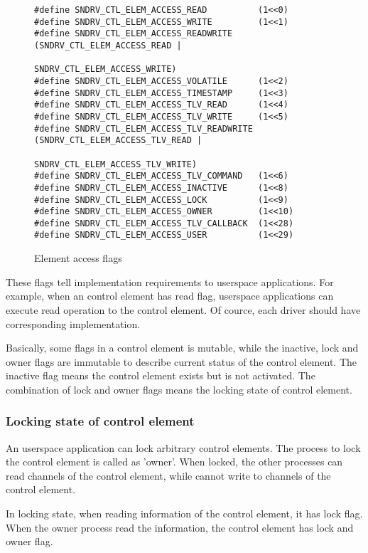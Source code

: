 \documentclass[onecolumn]{article}
\begin{document}
\begin{figure}[htbp]
\small
\begin{verbatim}
#define SNDRV_CTL_ELEM_ACCESS_READ          (1<<0)
#define SNDRV_CTL_ELEM_ACCESS_WRITE         (1<<1)
#define SNDRV_CTL_ELEM_ACCESS_READWRITE     (SNDRV_CTL_ELEM_ACCESS_READ |
                                             SNDRV_CTL_ELEM_ACCESS_WRITE)
#define SNDRV_CTL_ELEM_ACCESS_VOLATILE      (1<<2)
#define SNDRV_CTL_ELEM_ACCESS_TIMESTAMP     (1<<3)
#define SNDRV_CTL_ELEM_ACCESS_TLV_READ      (1<<4)
#define SNDRV_CTL_ELEM_ACCESS_TLV_WRITE     (1<<5)
#define SNDRV_CTL_ELEM_ACCESS_TLV_READWRITE (SNDRV_CTL_ELEM_ACCESS_TLV_READ |
                                             SNDRV_CTL_ELEM_ACCESS_TLV_WRITE)
#define SNDRV_CTL_ELEM_ACCESS_TLV_COMMAND   (1<<6)
#define SNDRV_CTL_ELEM_ACCESS_INACTIVE      (1<<8)
#define SNDRV_CTL_ELEM_ACCESS_LOCK          (1<<9)
#define SNDRV_CTL_ELEM_ACCESS_OWNER         (1<<10)
#define SNDRV_CTL_ELEM_ACCESS_TLV_CALLBACK  (1<<28)
#define SNDRV_CTL_ELEM_ACCESS_USER          (1<<29)
\end{verbatim}
\caption{{Element access flags}}
\label{fig:element-access-flags}
\end{figure}

These flags tell implementation requirements to userspace applications. For example, when an control element has read flag, userspace applications can execute read operation to the control element. Of cource, each driver should have corresponding implementation.

Basically, some flags in a control element is mutable, while the inactive, lock and owner flags are immutable to describe current status of the control element. The inactive flag means the control element exists but is not activated. The combination of lock and owner flags means the locking state of control element.


\subsubsection{Locking state of control element}

An userspace application can lock arbitrary control elements. The process to lock the control element is called as 'owner'. When locked, the other processes can read channels of the control element, while cannot write to channels of the control element.

In locking state, when reading information of the control element, it has lock flag. When the owner process read the information, the control element has lock and owner flag.
\end{document}
